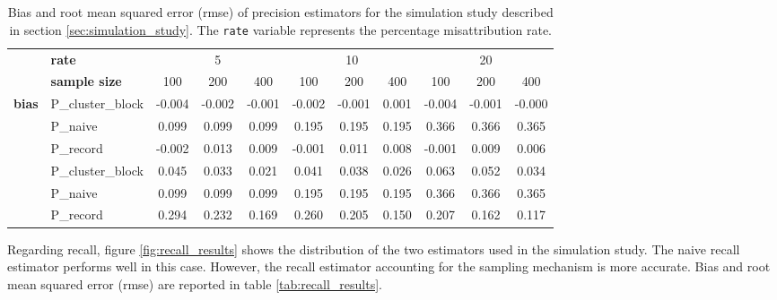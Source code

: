 \documentclass[fontsize=11pt]{article}
\theoremstyle{definition}
\begin{document}
\begin{table}\label{tab:precision_results}
    \centering
    \caption{\centering Bias and root mean squared error (rmse) of precision estimators for the simulation study described in section \ref{sec:simulation_study}. The \texttt{rate} variable represents the percentage misattribution rate.}
\begin{tabular}{llccccccccc}
\toprule
{} & \hfill{\textbf{rate}} & \multicolumn{3}{c}{5} & \multicolumn{3}{c}{10} & \multicolumn{3}{c}{20} \\
\cmidrule(lr){3-5}\cmidrule(lr){6-8}\cmidrule(lr){9-11}
{} & \hfill{\textbf{sample size}} & {100} & {200} & {400} & {100} & {200} & {400} & {100} & {200} & {400} \\
\midrule
\multirow[c]{4}{*}{\textbf{bias}} & P\_cluster\_block & -0.004 & -0.002 & -0.001 & -0.002 & -0.001 & 0.001 & -0.004 & -0.001 & -0.000 \\
 & P\_naive & 0.099 & 0.099 & 0.099 & 0.195 & 0.195 & 0.195 & 0.366 & 0.366 & 0.365 \\
 & P\_record & -0.002 & 0.013 & 0.009 & -0.001 & 0.011 & 0.008 & -0.001 & 0.009 & 0.006 \\
\midrule
\multirow[c]{4}{*}{\textbf{rmse}} & P\_cluster\_block & 0.045 & 0.033 & 0.021 & 0.041 & 0.038 & 0.026 & 0.063 & 0.052 & 0.034 \\
 & P\_naive & 0.099 & 0.099 & 0.099 & 0.195 & 0.195 & 0.195 & 0.366 & 0.366 & 0.365 \\
 & P\_record & 0.294 & 0.232 & 0.169 & 0.260 & 0.205 & 0.150 & 0.207 & 0.162 & 0.117 \\
\bottomrule
\end{tabular}
\end{table}

Regarding recall, figure \ref{fig:recall_results} shows the distribution of the two estimators used in the simulation study. The naive recall estimator performs well in this case. However, the recall estimator accounting for the sampling mechanism is more accurate. Bias and root mean squared error (rmse) are reported in table \ref{tab:recall_results}.
\end{document}
